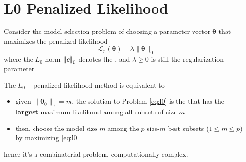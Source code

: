 \documentclass[twoside]{article}
\begin{document}

\section{L0 Penalized Likelihood}
Consider the model selection problem of choosing a parameter vector $\boldsymbol{\theta}$ that maximizes the penalized likelihood 
\begin{equation}\label{eq:l0}
    \mathcal{L}_n(\boldsymbol{\theta}) - \lambda \lVert \boldsymbol{\theta} \rVert _0
\end{equation}
where the $L_0$-norm $\lVert c\dot \rVert _0$ denotes the , and $\lambda\geq 0$ is still the regularization parameter.

The $L_0-$penalized likelihood method is equivalent to 
\begin{itemize}
    \item given $\lVert \boldsymbol{\theta}_0\rVert _0=m$, the solution to Problem \ref{eq:l0} is the  that has the \textbf{\underline{largest}} maximum likelihood among all subsets of size $m$
    \item then, choose the model size $m$ among the $p$ size-$m$ best subsets ($1\leq m\leq p$) by maximizing \ref{eq:l0}
\end{itemize}
hence it's a combinatorial problem, computationally complex.
\end{document}
